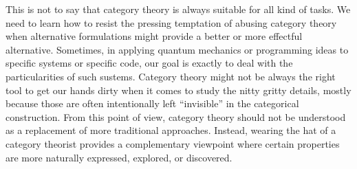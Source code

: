 
This is not to say that category theory is always suitable for all kind of tasks. 
We need to learn how to resist the pressing temptation of abusing category theory when alternative formulations might provide a better or more effectful alternative.  
Sometimes, in applying quantum mechanics or programming ideas to specific systems or specific code, our goal is exactly to deal with the particularities of such sustems. 
Category theory might not be always the right tool to get our hands dirty when it comes to study the nitty gritty details, mostly because those are often intentionally left ``invisible'' in the categorical construction. From this point of view, category theory should not be understood as a replacement of more traditional approaches. 
Instead, 
wearing the hat of a category theorist provides a complementary viewpoint where certain properties are more naturally expressed, explored, or discovered. 

\smallskip

\noindent\textsw{\myLocation, \myTime}


\begin{flushright}
        \myName
\end{flushright}

